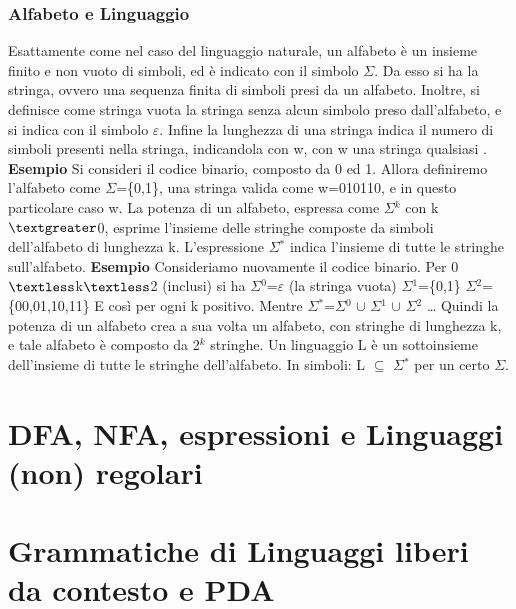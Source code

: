 \documentclass[]{article}
\begin{document}
\subsubsection{Alfabeto e Linguaggio}
Esattamente come nel caso del linguaggio naturale, un alfabeto è un insieme finito e non vuoto di simboli, ed è indicato con il simbolo $\Sigma$. Da esso si ha la stringa, ovvero una sequenza finita di simboli presi da un alfabeto. Inoltre, si definisce come stringa vuota la stringa senza alcun simbolo preso dall'alfabeto, e si indica con il simbolo $\varepsilon$. Infine la lunghezza di una stringa indica il numero di simboli presenti nella stringa, indicandola con \textbar w\textbar, con w una stringa qualsiasi .
\newline
\newline
\textbf{Esempio}
Si consideri il codice binario, composto da 0 ed 1. Allora definiremo l'alfabeto come $\Sigma$=\{0,1\}, una stringa valida come w=010110, e in questo particolare caso \textbar w.
\newline
\newline
La potenza di un alfabeto, espressa come $\Sigma$$^k$ con k$\textgreater$0, esprime l'insieme delle stringhe composte da simboli dell'alfabeto di lunghezza k. L'espressione $\Sigma$$^*$ indica l'insieme di tutte le stringhe sull'alfabeto.
\newline
\newline
\textbf{Esempio}
Consideriamo nuovamente il codice binario. Per 0$\textless$k$\textless$2 (inclusi) si ha \newline
$\Sigma$$^0$=$\varepsilon$ (la stringa vuota) \newline
$\Sigma$$^1$=\{0,1\}\newline
$\Sigma$$^2$=\{00,01,10,11\} \newline
E così per ogni k positivo. Mentre $\Sigma$$^*$=$\Sigma$$^0$ $\cup$ $\Sigma$$^1$ $\cup$ $\Sigma$$^2$ \ldots \newline \newline 
Quindi la potenza di un alfabeto crea a sua volta un alfabeto, con stringhe di lunghezza k, e tale alfabeto è composto da 2$^k$ stringhe. 
\newline
\newline
Un linguaggio L è un sottoinsieme dell'insieme di tutte le stringhe dell'alfabeto. In simboli: L $\subseteq$ $\Sigma$$^*$ per un certo $\Sigma$.
\section{DFA, NFA, espressioni e Linguaggi (non) regolari}
\section{Grammatiche di Linguaggi liberi da contesto e PDA}
\end{document}
